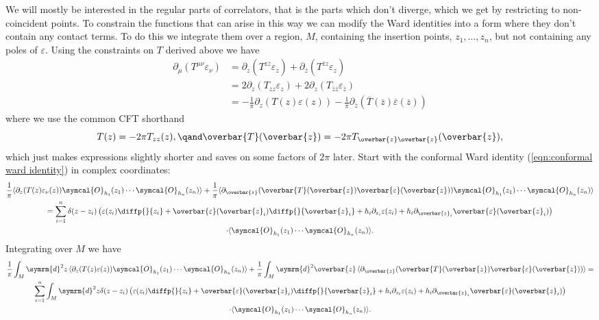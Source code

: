 \documentclass[fleqn]{NotesClass}
\renewcommand{\dl}[1]{\symrm{d}#1}
\newcommand{\quantumField}[1]{\symcal{#1}}
\DeclarePairedDelimiter{\correlator}{\langle}{\rangle}
\begin{document}
    We will mostly be interested in the regular parts of correlators, that is the parts which don't diverge, which we get by restricting to non-coincident points.
    To constrain the functions that can arise in this way we can modify the Ward identities into a form where they don't contain any contact terms.
    To do this we integrate them over a region, \(M\), containing the insertion points, \(z_1, \dotsc, z_n\), but not containing any poles of \(\varepsilon\).
    Using the constraints on \(T\) derived above we have
    \begin{align}
        \partial_\mu (T^{\mu\nu} \varepsilon_\nu) &= \partial_z (T^{z\overbar{z}}\varepsilon_z) + \partial_{\overbar{z}} (T^{\overbar{z}z} \varepsilon_z)\\
        &= 2\partial_z(T_{zz} \varepsilon_z) + 2\partial_z(T_{\overbar{z}\overbar{z}} \varepsilon_{\overbar{z}})\\
        &= -\frac{1}{\pi}\partial_z(T(z)\varepsilon(z)) -\frac{1}{\pi}\partial_{\overbar{z}}(\overbar{T}(\overbar{z})\overbar{\varepsilon}(\overbar{z}))
    \end{align}
    where we use the common CFT shorthand
    \begin{equation}
        T(z) = -2\pi T_{zz}(z), \qand \overbar{T}(\overbar{z}) = -2\pi T_{\overbar{z}\overbar{z}}(\overbar{z}),
    \end{equation}
    which just makes expressions slightly shorter and saves on some factors of \(2\pi\) later.
    Start with the conformal Ward identity (\cref{eqn:conformal ward identity}) in complex coordinates:
    \begin{multline}
        \frac{1}{\pi}\correlator{\partial_z(T(z)\varepsilon_\nu(z)) \quantumField{O}_{h_1}(z_1) \dotsm \quantumField{O}_{h_n}(z_n)} + \frac{1}{\pi}\correlator{\partial_{\overbar{z}}(\overbar{T}(\overbar{z})\overbar{\varepsilon}(\overbar{z})) \quantumField{O}_{h_1}(z_1) \dotsm \quantumField{O}_{h_n}(z_n)}\\
        = \sum_{i=1}^n \delta(z - z_i)\left( \varepsilon(z_i) \diffp{}{z_i} + \overbar{\varepsilon}(\overbar{z}_i) \diffp{}{\overbar{z}_i} + h_i \partial_{z_i}\varepsilon(z_i) + h_i \partial_{\overbar{z}_i} \overbar{\varepsilon}(\overbar{z}_i) \right)\\
        \cdot\correlator{\quantumField{O}_{h_1}(z_1) \dotsm \quantumField{O}_{h_n}(z_n)}.
    \end{multline}
    Integrating over \(M\) we have
    \begin{multline}
        \frac{1}{\pi} \int_M \dl{^2z} \, \correlator{\partial_z(T(z)\varepsilon(z)) \quantumField{O}_{h_1}(z_1) \dotsm \quantumField{O}_{h_n}(z_n)} + \frac{1}{\pi} \int_M \dl{^2\overbar{z}} \, \correlator{\partial_{\overbar{z}}(\overbar{T}(\overbar{z})\overbar{\varepsilon}(\overbar{z}))} =\\
        \sum_{i=1}^n \int_M \dl{^2z} \delta(z - z_i)\left( \varepsilon(z_i) \diffp{}{z_i} + \overbar{\varepsilon}(\overbar{z}_i) \diffp{}{\overbar{z}_i} + h_i \partial_{z_i}\varepsilon(z_i) + h_i \partial_{\overbar{z}_i} \overbar{\varepsilon}(\overbar{z}_i) \right)\\
        \cdot\correlator{\quantumField{O}_{h_1}(z_1) \dotsm \quantumField{O}_{h_n}(z_n)}.
    \end{multline}
\end{document}
